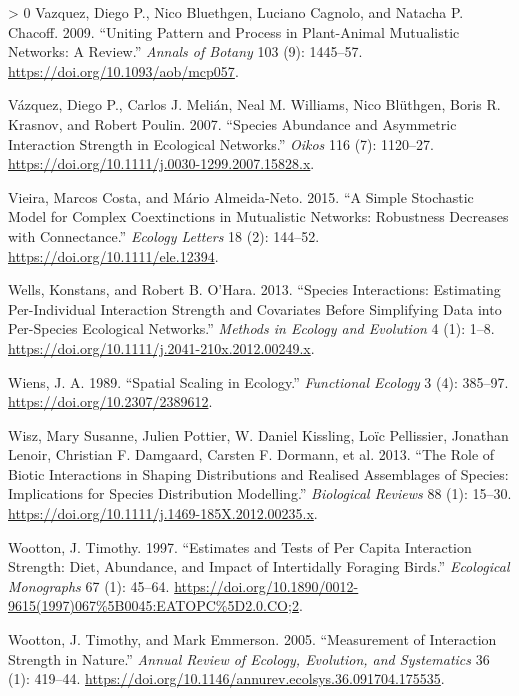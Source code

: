 \documentclass[11pt]{article}
\newlength{\cslhangindent}
\newenvironment{CSLReferences}[3] %
 {%
  \setlength{\parindent}{0pt}
  \ifodd #1 \everypar{\setlength{\hangindent}{\cslhangindent}}\ignorespaces\fi
  \ifnum #2 > 0
  \setlength{\parskip}{#2\baselineskip}
  \fi
 }%
 {}
\begin{document}
\begin{CSLReferences}{1}{0}
\leavevmode\hypertarget{ref-Vazquez2009UniPat}{}%
Vazquez, Diego P., Nico Bluethgen, Luciano Cagnolo, and Natacha P.
Chacoff. 2009. {``Uniting Pattern and Process in Plant-Animal
Mutualistic Networks: A Review.''} \emph{Annals of Botany} 103 (9):
1445--57. \url{https://doi.org/10.1093/aob/mcp057}.

\leavevmode\hypertarget{ref-Vazquez2007SpeAbu}{}%
Vázquez, Diego P., Carlos J. Melián, Neal M. Williams, Nico Blüthgen,
Boris R. Krasnov, and Robert Poulin. 2007. {``Species Abundance and
Asymmetric Interaction Strength in Ecological Networks.''} \emph{Oikos}
116 (7): 1120--27.
\url{https://doi.org/10.1111/j.0030-1299.2007.15828.x}.

\leavevmode\hypertarget{ref-Vieira2015SimSto}{}%
Vieira, Marcos Costa, and Mário Almeida-Neto. 2015. {``A Simple
Stochastic Model for Complex Coextinctions in Mutualistic Networks:
Robustness Decreases with Connectance.''} \emph{Ecology Letters} 18 (2):
144--52. \url{https://doi.org/10.1111/ele.12394}.

\leavevmode\hypertarget{ref-Wells2013SpeInt}{}%
Wells, Konstans, and Robert B. O'Hara. 2013. {``Species Interactions:
Estimating Per-Individual Interaction Strength and Covariates Before
Simplifying Data into Per-Species Ecological Networks.''} \emph{Methods
in Ecology and Evolution} 4 (1): 1--8.
\url{https://doi.org/10.1111/j.2041-210x.2012.00249.x}.

\leavevmode\hypertarget{ref-Wiens1989SpaSca}{}%
Wiens, J. A. 1989. {``Spatial Scaling in Ecology.''} \emph{Functional
Ecology} 3 (4): 385--97. \url{https://doi.org/10.2307/2389612}.

\leavevmode\hypertarget{ref-Wisz2013RolBio}{}%
Wisz, Mary Susanne, Julien Pottier, W. Daniel Kissling, Loïc Pellissier,
Jonathan Lenoir, Christian F. Damgaard, Carsten F. Dormann, et al. 2013.
{``The Role of Biotic Interactions in Shaping Distributions and Realised
Assemblages of Species: Implications for Species Distribution
Modelling.''} \emph{Biological Reviews} 88 (1): 15--30.
\url{https://doi.org/10.1111/j.1469-185X.2012.00235.x}.

\leavevmode\hypertarget{ref-Wootton1997EstTes}{}%
Wootton, J. Timothy. 1997. {``Estimates and Tests of Per Capita
Interaction Strength: Diet, Abundance, and Impact of Intertidally
Foraging Birds.''} \emph{Ecological Monographs} 67 (1): 45--64.
\url{https://doi.org/10.1890/0012-9615(1997)067\%5B0045:EATOPC\%5D2.0.CO;2}.

\leavevmode\hypertarget{ref-Wootton2005MeaInt}{}%
Wootton, J. Timothy, and Mark Emmerson. 2005. {``Measurement of
Interaction Strength in Nature.''} \emph{Annual Review of Ecology,
Evolution, and Systematics} 36 (1): 419--44.
\url{https://doi.org/10.1146/annurev.ecolsys.36.091704.175535}.


\end{CSLReferences}
\end{document}
